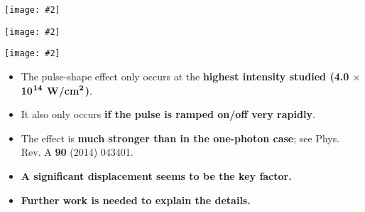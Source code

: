 \documentclass[landscape,a0b,final]{a0poster}
\newenvironment{poster}{
  \begin{center}
  \begin{minipage}[c]{0.98\textwidth}
}{
  \end{minipage} 
  \end{center}
}
\newcommand{\pbox}[4]{
\psshadowbox[#3]{
\begin{minipage}[t][#2][t]{#1}
#4
\end{minipage}
}}
\newcommand{\myfig}[3][0]{
\begin{center}
  \vspace{1.5cm}
  \texttt{[image: \#2]}
  \nobreak\medskip
\end{center}}
\begin{document}
\begin{poster}
\begin{multicols}{3}
\begin{multicols}{2}
  \begin{center}
  \myfig{c_fourier_350_10_20_10.ps}{.85}
  \end{center}
  \end{multicols}

  \vspace{-2.5cm}
  \setlength{\columnsep}{0pt}
  \setlength{\columnseprule}{0pt}
  \hspace{-2cm}
  \begin{multicols}{2}
  \begin{center}
  \myfig{c_displacement_350_2_36_2.ps}{.85}
  \end{center}

  \begin{center}
  \myfig{c_displacement_350_10_20_10.ps}{.85}
  \end{center}
  \end{multicols}

  \begin{center}\pbox{0.8\columnwidth}{}{linewidth=2mm,framearc=0.1,linecolor=lightblue,fillstyle=gradient,
             gradangle=0,gradbegin=whiteblue,gradend=whiteblue,gradmidpoint=1.0,framesep=1em}{\begin{center}{\Large\bf Conclusions}\end{center}}\end{center}\vspace{0.375cm}

\begin{itemize}
\item The pulse-shape effect only occurs at the {\bf\color{red} highest intensity studied (4.0 $\bm{\times}$ 10$^{\bf 14}$ W/cm$^{\bf 2}$)}.
\item It also only occurs {\bf\color{red} if the pulse is ramped on/off very rapidly}.
\item The effect is {\bf\color{blue} much stronger than in the one-photon case}; see Phys. Rev. A {\bf 90} (2014) 043401.
\item {\bf\color{red} A significant displacement seems to be the key factor.}
\item {\bf\color{newgreen} Further work is needed to explain the details.}
\end{itemize}


  \vfill
  \columnbreak


\end{multicols}
\end{poster}
\end{document}
